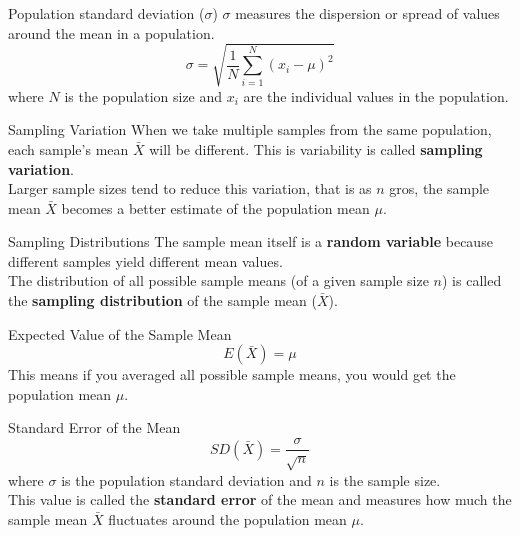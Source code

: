 \documentclass[9pt]{extarticle}
\begin{document}
\begin{definitionbox}{Population standard deviation ($\sigma$)}{}
    $\sigma$ measures the dispersion or spread of values around the mean in a population.
    $$\sigma = \sqrt{\frac{1}{N} \sum_{i=1}^{N} (x_i - \mu)^2}$$
    where $N$ is the population size and $x_i$ are the individual values in the population.\\
\end{definitionbox}

\begin{conceptbox}{Sampling Variation}{}
    When we take multiple samples from the same population, each sample's mean $\bar{X}$ will be different. This is variability is called \textbf{sampling variation}. \\

    Larger sample sizes tend to reduce this variation, that is as $n$ gros, the sample mean $\bar{X}$ becomes a better estimate of the population mean $\mu$.
\end{conceptbox}
\begin{conceptbox}{Sampling Distributions}{}
    The sample mean itself is a \textbf{random variable} because different samples yield different mean values.\\

    The distribution of all possible sample means (of a given sample size $n$) is called the \textbf{sampling distribution} of the sample mean ($\bar{X}$).
\end{conceptbox}

\begin{definitionbox}{Expected Value of the Sample Mean}{}
    $$E(\bar{X}) = \mu$$
    This means if you averaged all possible sample means, you would get the population mean $\mu$.
\end{definitionbox}
\begin{definitionbox}{Standard Error of the Mean}{}
    $$SD(\bar{X}) = \frac{\sigma}{\sqrt{n}}$$
    where $\sigma$ is the population standard deviation and $n$ is the sample size.\\

    This value is called the \textbf{standard error} of the mean and measures how much the sample mean $\bar{X}$ fluctuates around the population mean $\mu$.
\end{definitionbox}
\end{document}
